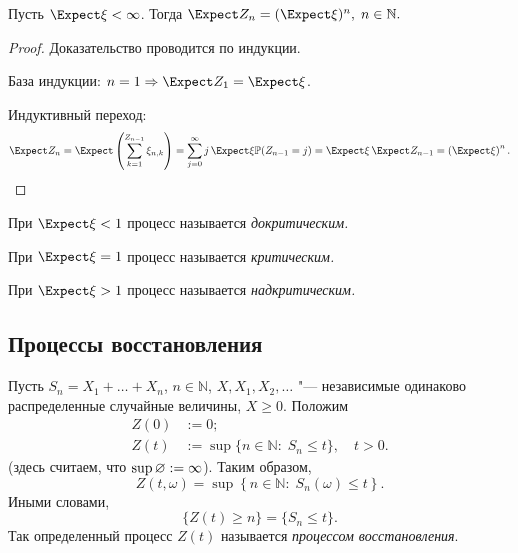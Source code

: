 \begin{cor}
	Пусть $\Expect \xi < \bes$.
Тогда $\Expect Z_{n} = (\Expect \xi)^{n},\; n \in \mathbb{N}{.}$
\end{cor}

\begin{proof}
	Доказательство проводится по индукции.

	База индукции: $n=1 \Ra \Expect Z_{1} = \Expect \xi$.

	Индуктивный переход:
	\begin{equation*}
		\Expect Z_{n} = \Expect \left( \sum_{k=1}^{Z_{n-1}} \xi_{n,k} \right) = \sum\limits_{j=0}^{\bes} j \, \Expect \xi \Pbb (Z_{n-1} = j) = \Expect \xi \, \Expect Z_{n-1} = \left(\Expect \xi \right)^{n}.
	\end{equation*}
\end{proof}

\begin{df}\mbox{}

	При $\Expect \xi < 1$ процесс называется \emph{докритическим.}

	При $\Expect \xi = 1$ процесс называется \emph{критическим.}

	При $\Expect \xi > 1$ процесс называется \emph{надкритическим.}
\end{df}

\subsection{Процессы восстановления}

\begin{df}
	Пусть $S_{n} = X_{1} + \ldots + X_{n}$, $n \in \mathbb{N}$, $X, X_{1}, X_{2}, \ldots$ "--- независимые одинаково распределенные случайные величины, $X \geqslant 0$.
Положим
	\begin{align*}
		Z(0) &:= 0;\\
		Z(t) &:= \sup \lbrace n \in \mathbb{N}:\; S_{n} \leqslant t \rbrace{,}\quad t > 0.
	\end{align*}
	(здесь считаем, что $\sup \varnothing := \infty$).
Таким образом,
	\begin{equation*}
		Z(t, \omega) = \sup \left\lbrace n \in \mathbb{N}: \; S_{n}(\omega) \leqslant t \right\rbrace{.}
	\end{equation*}
	Иными словами,
	\begin{equation*}
		\lbrace Z(t) \geqslant n \rbrace = \lbrace S_{n} \leqslant t \rbrace{.}
	\end{equation*}
	Так определенный процесс $Z(t)$ называется \emph{процессом восстановления}.
\end{df}

